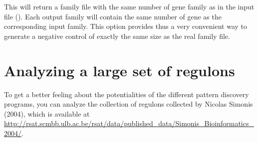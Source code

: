 This will return a family file with the same number of gene family as
in the input file (). Each output family will contain
the same number of gene as the corresponding input family. This option
provides thus a very convenient way to generate a negative control of
exactly the same size as the real family file.

\section{Analyzing a large set of regulons}

To get a better feeling about the potentialities of the different
pattern discovery programs, you can analyze the collection of regulons
collected by Nicolas Simonis (2004), which is available at
\url{http://rsat.scmbb.ulb.ac.be/rsat/data/published\_data/Simonis\_Bioinformatics\_2004/}.

